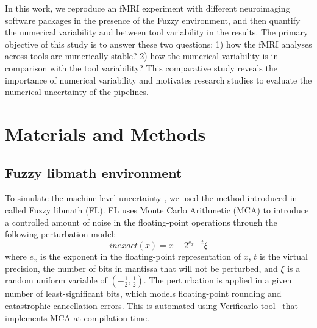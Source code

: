\documentclass[conference]{IEEEtran}
\begin{document}
In this work, we reproduce an fMRI experiment with different neuroimaging software packages in the presence of the Fuzzy environment,
and then quantify the numerical variability and between tool variability in the results. 
The primary objective of this study is to answer these two questions: 1) how the fMRI analyses across tools are numerically stable?
2) how the numerical variability is in comparison with the tool variability?
This comparative study reveals the importance of numerical variability and motivates research studies to evaluate the numerical uncertainty of the pipelines.
  


\section{Materials and Methods}

\subsection{Fuzzy libmath environment}

To simulate the machine-level uncertainty , we used the method introduced in~\cite{salari2021accurate}
called Fuzzy libmath (FL). FL uses Monte Carlo Arithmetic (MCA) to
introduce a controlled amount of noise in the floating-point operations 
through the following perturbation model:
\begin{equation} \label{eq:mca_inexact}
  inexact(x) = x + 2^{e_x-t}\xi
\end{equation}
where $e_x$ is the exponent in the floating-point representation of $x$,
$t$ is the virtual precision, the number of bits in mantissa that will not be perturbed,
and $\xi$ is a random uniform variable of $(-\frac{1}{2}, \frac{1}{2})$.
The perturbation is applied in a given number of least-significant bits,
which models floating-point rounding and catastrophic cancellation errors.
This is automated using Verificarlo tool~\cite{denis2015verificarlo} that implements MCA at compilation time.
\end{document}
